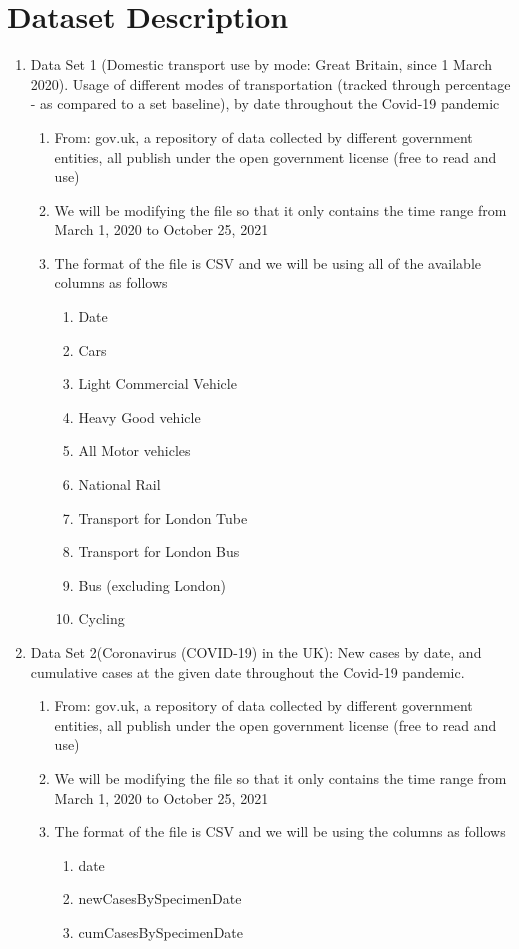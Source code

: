\documentclass[fontsize=11pt]{article}
\begin{document}
\section*{Dataset Description}

\begin{enumerate}
    \item Data Set 1 (Domestic transport use by mode: Great Britain, since 1 March 2020).
Usage of different modes of transportation (tracked through percentage - as compared to a set baseline), by date throughout the Covid-19 pandemic
    \begin{enumerate}
        \item From: gov.uk,  a repository of data collected by different government entities, all publish under the open government license (free to read and use)
        \item We will be modifying the file so that it only contains the time range from March 1, 2020 to October 25, 2021
        \item The format of the file is CSV and we will be using all of the available columns as follows
        \begin{enumerate}
            \item Date
            \item Cars
            \item Light Commercial Vehicle
            \item Heavy Good vehicle
            \item All Motor vehicles
            \item National Rail
            \item Transport for London Tube
            \item  Transport for London Bus
            \item Bus (excluding London)
            \item Cycling
        \end{enumerate}
    \end{enumerate}
    \item Data Set 2(Coronavirus (COVID-19) in the UK): New cases by date, and cumulative cases at the given date throughout the Covid-19 pandemic.
    \begin{enumerate}
        \item From: gov.uk,  a repository of data collected by different government entities, all publish under the open government license (free to read and use)
        \item We will be modifying the file so that it only contains the time range from March 1, 2020 to October 25, 2021
        \item The format of the file is CSV and we will be using the columns as follows
        \begin{enumerate}
            \item date
            \item newCasesBySpecimenDate
            \item cumCasesBySpecimenDate
        \end{enumerate}

    \end{enumerate}
\end{enumerate}
\end{document}
